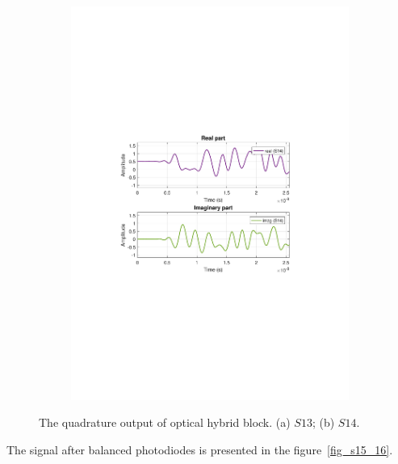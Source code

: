 \begin{refsection}
\begin{figure}[h!]
\begin{subfigure}{.5\textwidth}
  \includegraphics[width=\linewidth]{./sdf/dsp_laser_phase_compensation/figures/S14_td.pdf}
  \caption{}
  \label{fig:sub2}
\end{subfigure}
\caption{The quadrature output of optical hybrid block. (a) $S13$; (b) $S14$.}
\label{fig_s11_12}
\end{figure}

The signal after balanced photodiodes is presented in the figure~\ref{fig_s15_16}.


\end{refsection}
